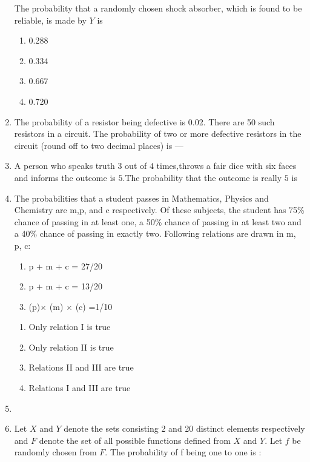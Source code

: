 \documentclass[journal,12pt,twocolumn]{IEEEtran}
\begin{document}
\begin{enumerate}
The probability that a randomly chosen shock absorber, which is found to be reliable, is made by $Y$ is
\begin{enumerate}
\item  0.288
\item 0.334
\item  0.667
\item 0.720
\end{enumerate}
%
\solution

%
\item The probability of a resistor being defective is 0.02. There are 50 such resistors in a circuit. The probability of two or more defective resistors in the circuit (round off to two decimal places) is ---
%
\solution

%
\item A person who speaks truth $3$ out of $4$ times,throws a fair dice with six faces and informs the outcome is $5$.The probability that the outcome is really $5$ is
\\
\solution

%
\item  The probabilities that a student passes in Mathematics, Physics and Chemistry are m,p, and
c respectively. Of these subjects, the student has 75\% chance of passing in at least one, a
50\% chance of passing in at least two and a 40\% chance of passing in exactly two.
Following relations are drawn in m, p, c:
    \begin{enumerate}[label=(\Roman*)]
        \item p + m + c = 27/20
        \item p + m + c = 13/20
        \item (p)$\times$ (m) $\times$ (c) =1/10
    \end{enumerate}
    \begin{enumerate}[label=(\Alph*)]
      \item Only relation I is true
      \item Only relation II is true
      \item Relations II and III are true
      \item Relations I and III are true
    \end{enumerate}
%
\solution

%
\item 
\solution

%
\item Let $X$ and $Y$ denote the sets consisting 2 and 20 distinct elements respectively and $F$ denote the set of all possible functions defined from $X$ and $Y$. Let $f$ be randomly chosen from $F$. The probability of f being one to one is :

\end{enumerate}
\end{document}

